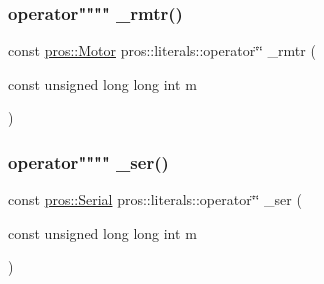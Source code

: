 \mbox{\label{namespacepros_1_1literals_ae119de976796a7e955cb4e9ee580f137}} 
\subsubsection{\texorpdfstring{operator"""" \+\_\+rmtr()}{operator"" \_rmtr()}}
{\footnotesize\ttfamily const \hyperlink{classpros_1_1Motor}{pros\+::\+Motor} pros\+::literals\+::operator\char`\"{}\char`\"{} \+\_\+rmtr (\begin{DoxyParamCaption}\item[{const unsigned long long int}]{m }\end{DoxyParamCaption})}

\mbox{\label{namespacepros_1_1literals_a4641b7d1ffd17d105b953d25da9ed40b}} 
\subsubsection{\texorpdfstring{operator"""" \+\_\+ser()}{operator"" \_ser()}}
{\footnotesize\ttfamily const \hyperlink{classpros_1_1Serial}{pros\+::\+Serial} pros\+::literals\+::operator\char`\"{}\char`\"{} \+\_\+ser (\begin{DoxyParamCaption}\item[{const unsigned long long int}]{m }\end{DoxyParamCaption})}

